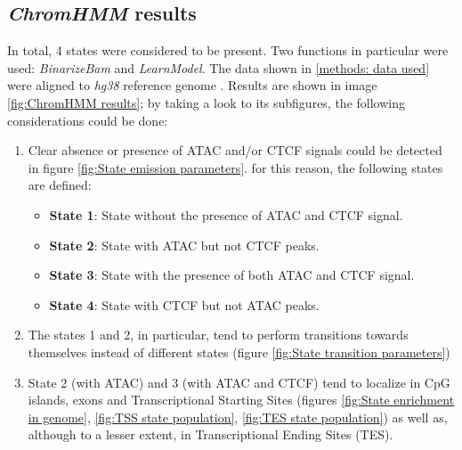 \subsection{\textit{ChromHMM} results} \label{chap: ChromHMM results} %

In total, 4 states were considered to be present. Two functions in particular were used: \textit{BinarizeBam} and \textit{LearnModel}. The data shown in \ref{methods: data used} were aligned to \textit{hg38} reference genome
\cite{HomoSapiensGenome}
. Results are shown in image \ref{fig:ChromHMM results}; by taking a look to its subfigures, the following considerations could be done:

\begin{enumerate}
  \item Clear absence or presence of ATAC and/or CTCF signals could be detected in figure \ref{fig:State emission parameters}. for this reason, the following states are defined:
  \begin{itemize}
    \item \textbf{State 1}: State without the presence of ATAC and CTCF signal.
    \item \textbf{State 2}: State with ATAC but not CTCF peaks.
    \item \textbf{State 3}: State with the presence of both ATAC and CTCF signal.
    \item \textbf{State 4}: State with CTCF but not ATAC peaks.
  \end{itemize}
  \item The states 1 and 2, in particular, tend to perform transitions towards themselves instead of different states (figure \ref{fig:State transition parameters})
  \item State 2 (with ATAC) and 3 (with ATAC and CTCF) tend to localize in CpG islands, exons and Transcriptional Starting Sites (figures \ref{fig:State enrichment in genome}, \ref{fig:TSS state population}, \ref{fig:TES state population}) as well as, although to a lesser extent, in Transcriptional Ending Sites (TES).
\end{enumerate}

